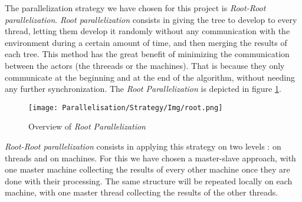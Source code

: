 The parallelization strategy we have chosen for this project is \emph{Root-Root parallelization}.
\emph{Root parallelization} consists in giving the tree to develop to every thread, letting them develop it randomly without any communication with the environment during a certain amount of time, and then merging the results of each tree.
This method has the great benefit of minimizing the communication between the actors (the threeads or the machines).
That is because they only communicate at the beginning and at the end of the algorithm, without needing any further synchronization.
The \textit{Root Parallelization} is depicted in figure \ref{fig:root}.

\begin{figure}[!ht] 
\centerline{\texttt{[image: Parallelisation/Strategy/Img/root.png]}}
   \caption{Overview of \emph{Root Parallelization} \cite{parallel_comp}}
\label{fig:root}
\end{figure}

\emph{Root-Root parallelization} consists in applying this strategy on two levels : on threads and on machines.
For this we have chosen a master-slave approach, with one master machine collecting the results of every other machine once they are done with their processing.
The same structure will be repeated locally on each machine, with one master thread collecting the results of the other threads.